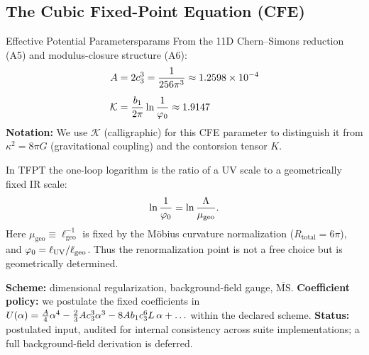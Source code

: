 \subsection{The Cubic Fixed-Point Equation (CFE)}

\begin{definition}{Effective Potential Parameters}{params}
From the 11D Chern--Simons reduction (A5) and modulus-closure structure (A6):
\begin{align}
    A &= 2c_3^3 = \frac{1}{256\pi^3} \approx 1.2598 \times 10^{-4}\\[0.5em]
    \mathcal{K} &= \frac{b_1}{2\pi}\ln\frac{1}{\varphi_0} \approx 1.9147
\end{align}
\textbf{Notation:} We use $\mathcal{K}$ (calligraphic) for this CFE parameter to 
distinguish it from $\kappa^2 = 8\pi G$ (gravitational coupling) and the contorsion tensor $K$.
\end{definition}

\begin{tcolorbox}[colback=gray!5, colframe=gray!60,
    title={\textbf{Lemma (Geometric Fixing of the Log)}}, fonttitle=\bfseries\small]
In TFPT the one-loop logarithm is the ratio of a UV scale to a geometrically fixed IR scale:
\begin{equation}
    \ln\frac{1}{\varphi_0} = \ln\frac{\Lambda}{\mu_{\text{geo}}}.
\end{equation}
Here $\mu_{\text{geo}} \equiv \ell_{\text{geo}}^{-1}$ is fixed by the M\"obius curvature
normalization ($R_{\text{total}}=6\pi$), and $\varphi_0 = \ell_{\text{UV}}/\ell_{\text{geo}}$.
Thus the renormalization point is not a free choice but is geometrically determined.
\end{tcolorbox}

\begin{tcolorbox}[colback=yellow!3, colframe=yellow!60!black,
    title={\textbf{Quantization and scheme declaration}}, fonttitle=\bfseries\small]
\textbf{Scheme:} dimensional regularization, background-field gauge, $\overline{\mathrm{MS}}$.
\textbf{Coefficient policy:} we postulate the fixed coefficients in
$U(\alpha)=\frac{A}{4}\alpha^4-\frac{2}{3}Ac_3^3\alpha^3-8Ab_1c_3^6 L\,\alpha+\ldots$
within the declared scheme.
\textbf{Status:} postulated input, audited for internal consistency across suite implementations;
a full background-field derivation is deferred.
\end{tcolorbox}

